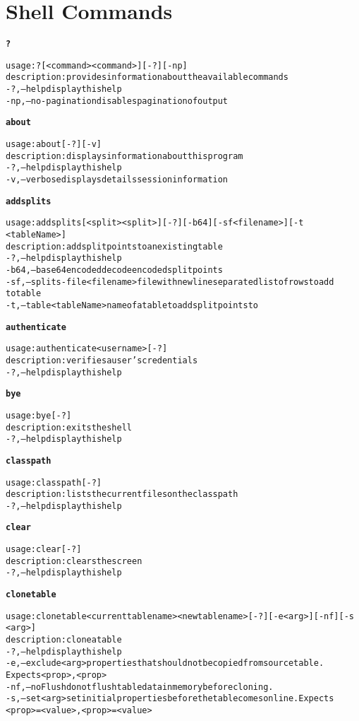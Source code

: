 \chapter{Shell Commands}

\begin{alltt}
\textbf{?}

    usage: ? [ <command>{ <command>} ] [-?] [-np]
    description: provides information about the available commands
      -?,--help  display this help
      -np,--no-pagination  disables pagination of output

\textbf{about}

    usage: about [-?] [-v]
    description: displays information about this program
      -?,--help  display this help
      -v,--verbose	displays details session information

\textbf{addsplits}

    usage: addsplits [<split>{ <split>} ] [-?] [-b64] [-sf <filename>] [-t
    	      <tableName>]
    description: add split points to an existing table
      -?,--help  display this help
      -b64,--base64encoded	decode encoded split points
      -sf,--splits-file <filename>	file with newline separated list of rows to add
    	      to table
      -t,--table <tableName>  name of a table to add split points to

\textbf{authenticate}

    usage: authenticate <username> [-?]
    description: verifies a user's credentials
      -?,--help  display this help

\textbf{bye}

    usage: bye [-?]
    description: exits the shell
      -?,--help  display this help

\textbf{classpath}

    usage: classpath [-?]
    description: lists the current files on the classpath
      -?,--help  display this help

\textbf{clear}

    usage: clear [-?]
    description: clears the screen
      -?,--help  display this help

\textbf{clonetable}

    usage: clonetable <current table name> <new table name> [-?] [-e <arg>] [-nf] [-s
    	      <arg>]
    description: clone a table
      -?,--help  display this help
      -e,--exclude <arg>  properties that should not be copied from source table.
    	      Expects <prop>{,<prop>}
      -nf,--noFlush  do not flush table data in memory before cloning.
      -s,--set <arg>  set initial properties before the table comes online. Expects
    	      <prop>=<value>{,<prop>=<value>}


\end{alltt}
